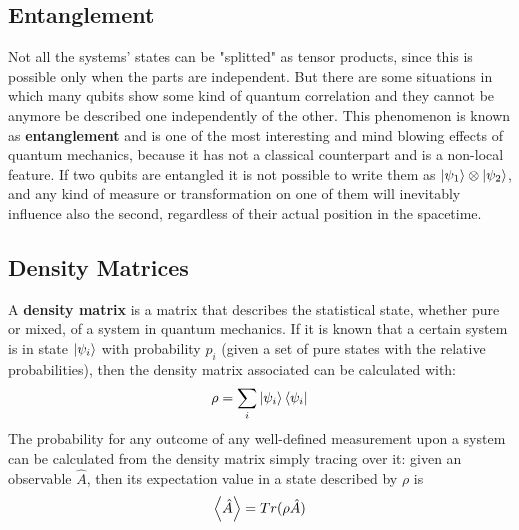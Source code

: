 \subsection{Entanglement}
Not all the systems' states can be "splitted" as tensor products, since this is possible only when the parts are independent. But there are some situations in which many qubits show some kind of quantum correlation and they cannot be anymore be described one independently of the other. This phenomenon is known as \textbf{entanglement} and is one of the most interesting and mind blowing effects of quantum mechanics, because it has not a classical counterpart and is a non-local feature. If two qubits are entangled it is not possible to write them as $\ket{\psi_1}\otimes\ket{\psi_2}$, and any kind of measure or transformation on one of them will inevitably influence also the second, regardless of their actual position in the spacetime.\\

\subsection{Density Matrices}
A \textbf{density matrix} is a matrix that describes the statistical state, whether pure or mixed, of a system in quantum mechanics. If it is known that a certain system is in state $\ket{\psi_i}$ with probability $p_i$ (given a set of pure states with the relative probabilities), then the density matrix associated can be calculated with:
\[ \rho = \sum_i\ket{\psi_i}\bra{\psi_i} \]
The probability for any outcome of any well-defined measurement upon a system can be calculated from the density matrix simply tracing over it: given an observable $\hat{A}$, then its expectation value in a state described by $\rho$ is
\[ \expval{\hat{A}} = Tr(\rho\hat{A}) \]

